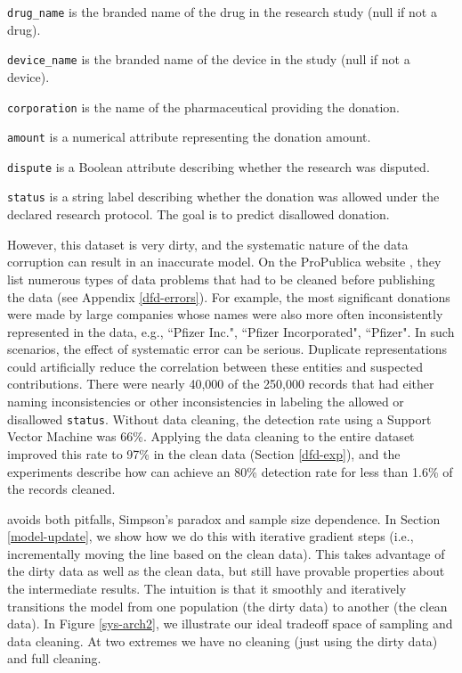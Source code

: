 \noindent\texttt{drug\_name} is the branded name of the drug in the research study (null if not a drug).

\noindent\texttt{device\_name} is the branded name of the device in the study (null if not a device).

\noindent\texttt{corporation} is the name of the pharmaceutical providing the donation.

\noindent\texttt{amount} is a numerical attribute representing the donation amount.

\noindent\texttt{dispute} is a Boolean attribute describing whether the research was disputed.

\noindent\texttt{status} is a string label describing whether the  donation was allowed under the declared research protocol. The goal is to predict disallowed  donation. 

\vspace{0.5em}

However, this dataset is very dirty, and the systematic nature of the data corruption can result in an inaccurate model.
On the ProPublica website \cite{dollarsfordocs}, they list numerous types of data problems that had to be cleaned before publishing the data (see Appendix \ref{dfd-errors}).
For example, the most significant donations were made by large companies whose names were also more often inconsistently represented in the data, e.g., ``Pfizer Inc.", ``Pfizer Incorporated", ``Pfizer".
In such scenarios, the effect of systematic error can be serious.
Duplicate representations could artificially reduce the correlation between these entities and suspected contributions.
There were nearly 40,000 of the 250,000 records that had either naming inconsistencies or other inconsistencies in labeling the allowed or disallowed \texttt{status}.
Without data cleaning, the detection rate using a Support Vector Machine was 66\%.
Applying the data cleaning to the entire dataset improved this rate to 97\% in the clean data (Section \ref{dfd-exp}), and the experiments describe how \sys can achieve an 80\% detection rate for less than 1.6\% of the records cleaned.



\iffalse
\sys avoids both pitfalls, Simpson's paradox and sample size dependence.
In Section \ref{model-update}, we show how we do this with iterative gradient steps (i.e., incrementally moving the line based on the clean data).
This takes advantage of the dirty data as well as the clean data, but still have provable properties about the intermediate results.
The intuition is that it smoothly and iteratively transitions the model from one population (the dirty data) to another (the clean data).
In Figure \ref{sys-arch2}, we illustrate our ideal tradeoff space of sampling and data cleaning.
At two extremes we have no cleaning (just using the dirty data) and full cleaning.

